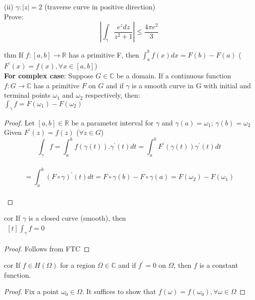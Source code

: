 (ii) $\gamma: |z|=2$  (traverse curve in positive direction)\\
Prove: $$|\int_{\gamma}^{} \frac{e^z dz}{z^2+1} | \leq \frac{4\pi e^2}{3}$$
\begin{restatable}{thm}{}\label{}
If $f:[a,b]\rightarrow \mathds{R}$ has a primitive F, then $\int_{a}^{b} f(x) dx =F(b)-F(a)$ \: ($F^{'}(x)=f(x), \forall x\in [a,b]$)\\
\textbf{For complex case}: Suppose $G\in \mathds{C}$ be a domain. If a continuous function $f:G\rightarrow \mathds{C}$ has a primitive $F$ on $G$ and if $\gamma$ is a smooth curve in G with initial and terminal points $\omega_1$ and $\omega_2$ respectively, then:\\
$\int_{\gamma}^{} f = F(\omega_1) - F(\omega_2)$
\end{restatable}
\begin{proof}
Let $[a,b]\in \mathds{R}$ be a parameter interval for $\gamma$ and $\gamma(a)=\omega_1$; $\gamma(b)=\omega_2$\\
Given $F^{'}(z)=f(z)$   ($\forall z \in G$)\\
$$\int_{\gamma}^{} f = \int_{a}^{b} f(\gamma(t)).\gamma^{'}(t) dt = \int_{a}^{b} F^{'}(\gamma(t))\gamma^{'}(t) dt$$\\
$$= \int_{a}^{b} (F \circ \gamma)^{'}(t) dt = F \circ \gamma(b)-F \circ \gamma(a)= F(\omega_2)-F(\omega_1)$$\\
\end{proof}
\begin{restatable}[]{cor}{}\label{}
If $\gamma$ is a closed curve (smooth), then\\
$\begin{aligned}[t] \int_{\gamma}^{} f =0\nonumber \end{aligned}$ 
\end{restatable}
\begin{proof}
Follows from FTC
\end{proof}
\begin{restatable}[]{cor}{}\label{}
If $f\in H(\Omega)$ for a region $\Omega\in \mathds{C}$ and if $f^{'}=0$ on $\Omega$, then $f$ is a constant function.
\end{restatable}
\begin{proof}
Fix a point $\omega_0\in \Omega$. It suffices to show that $f(\omega)=f(\omega_0), \forall \omega \in \Omega$
\end{proof}
